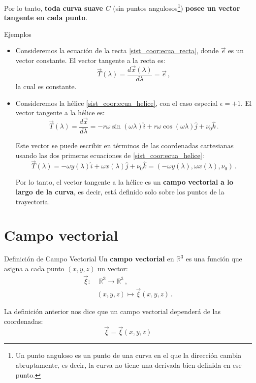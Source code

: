 \documentclass[../apunte_mecanica_clasica.tex]{subfiles}%
\begin{document}
Por lo tanto, \textbf{toda curva suave $C$} (sin puntos angulosos\footnote{Un punto anguloso es un punto de una curva en el que la dirección cambia abruptamente, es decir, la curva no tiene una derivada bien definida en ese punto.}) \textbf{posee un vector tangente en cada punto}.

\begin{apuntebloque}{Ejemplos}
\begin{itemize}
    \item Consideremos la ecuación de la recta \eqref{sist_coor:ecua_recta}, donde $\vec{e}$ es un vector constante. El vector tangente a la recta es:
        \begin{equation*}
            \vec{T}(\lambda) = \frac{d\vec{x}(\lambda)}{d\lambda} = \vec{e} \,,
        \end{equation*}
        la cual es constante.
        
    \item Consideremos la hélice \eqref{sist_coor:ecua_helice}, con el caso especial $\epsilon = +1$. El vector tangente a la hélice es:
        \begin{equation*}
            \vec{T}(\lambda) = \frac{d\vec{x}}{d\lambda} = -r \omega \sin(\omega \lambda)\hat{i} + r \omega \cos(\omega \lambda)\hat{j} + \nu_0 \hat{k} \,.
        \end{equation*}
        
        Este vector se puede escribir en términos de las coordenadas cartesianas usando las dos primeras ecuaciones de \eqref{sist_coor:ecua_helice}:
        \begin{equation*}
            \vec{T}(\lambda) = -\omega y(\lambda)\hat{i} + \omega x(\lambda)\hat{j} + \nu_0 \hat{k} = (-\omega y(\lambda), \omega x(\lambda), \nu_0)\,.
        \end{equation*}
        
        Por lo tanto, el vector tangente a la hélice es un \textbf{campo vectorial a lo largo de la curva}, es decir, está definido solo sobre los puntos de la trayectoria.
\end{itemize}



\end{apuntebloque}

\section{Campo vectorial}

\begin{apuntebloque}{Definición de Campo Vectorial}
Un \textbf{campo vectorial} en $\mathbb{R}^3$ es una función que asigna a cada punto $(x,y,z)$ un vector:
\begin{align*}
    \vec{\xi} :&\; \mathbb{R}^3 \to \mathbb{R}^3\,, \\ & (x,y,z) \mapsto \vec{\xi}(x,y,z)\,.
\end{align*}
\end{apuntebloque}
La definición anterior nos dice que un campo vectorial dependerá de las coordenadas:
\begin{equation*}
    \vec{\xi} = \vec{\xi}(x, y, z)
\end{equation*}
\end{document}
